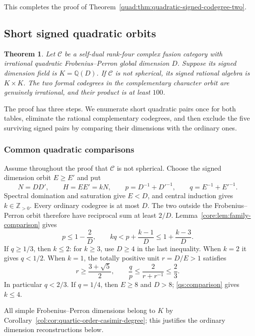 \documentclass[11pt,a4paper]{article}
\newtheorem{theorem}{Theorem}[section]
\theoremstyle{definition}\newtheorem{definition}[theorem]{Definition}
\theoremstyle{remark}\newtheorem{remark}[theorem]{Remark}
\newcommand{\C}{\mathcal C}
\newcommand{\Q}{\mathbb Q}
\newcommand{\ZZ}{\mathbb Z}
\numberwithin{equation}{section}
\begin{document}
This completes the proof of
Theorem~\ref{quad:thm:quadratic-signed-codegree-two}.

\subsection{Short signed quadratic orbits}\label{sec:short-signed}
\begin{theorem}\label{qs:short-orbits}
Let $\C$ be a self-dual rank-four complex fusion category
with irrational quadratic Frobenius--Perron global dimension $D$.
Suppose its signed dimension field is $K=\Q(D)$.
If $\C$ is not spherical, its signed rational algebra is
$K\times K$. The two formal codegrees in the complementary character
orbit are genuinely irrational, and their product is at least $100$.
\end{theorem}

The proof has three steps. We enumerate short quadratic pairs once
for both tables, eliminate the rational complementary codegrees, and
then exclude the five surviving signed pairs by comparing their
dimensions with the ordinary ones.

\subsubsection{Common quadratic comparisons}

Assume throughout the proof that $\C$ is not spherical.
Choose the signed dimension orbit $E\ge E'$ and put
\[
 N=DD',\qquad H=EE'=kN,\qquad
 p=D^{-1}+D'^{-1},\qquad q=E^{-1}+E'^{-1}.
\]
Spectral domination and saturation give $E<D$, and central induction
gives $k\in\ZZ_{>0}$. Every ordinary codegree is at most $D$.
The two outside the Frobenius--Perron orbit therefore have reciprocal
sum at least $2/D$. Lemma~\ref{core:lem:family-comparison} gives
\begin{equation}\label{qs:comparison}
 p\le1-\frac2D,\qquad
 kq<p+\frac{k-1}{D}\le1+\frac{k-3}{D}.
\end{equation}
If $q\ge1/3$, then $k\le2$: for $k\ge3$, use $D\ge4$ in the
last inequality. When $k=2$ it gives $q<1/2$.
When $k=1$, the totally positive unit $r=D/E>1$ satisfies
\[
 r\ge\frac{3+\sqrt5}{2},\qquad
 \frac qp\le\frac2{r+r^{-1}}\le\frac23.
\]
In particular $q<2/3$. If $q=1/4$, then $E\ge8$ and $D>8$;
\eqref{qs:comparison} gives $k\le4$.

All simple Frobenius--Perron dimensions belong to $K$ by
Corollary~\ref{col:cor:quartic-order-casimir-degree}; this justifies
the ordinary dimension reconstructions below.
\end{document}
